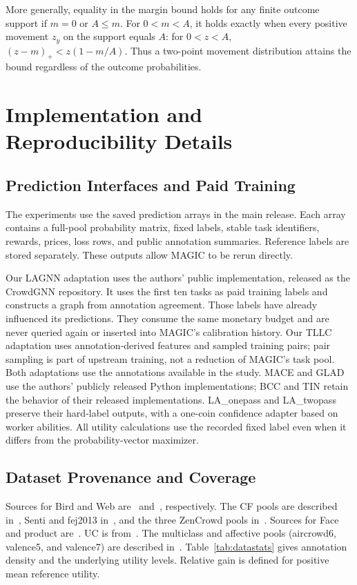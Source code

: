 \documentclass[journal]{IEEEtran}
\begin{document}
More generally, equality in the margin bound holds for any finite outcome support if $m=0$ or $A\le m$. For $0<m<A$, it holds exactly when every positive movement $z_y$ on the support equals $A$: for $0<z<A$, $(z-m)_+< z(1-m/A)$. Thus a two-point movement distribution attains the bound regardless of the outcome probabilities.

\section{Implementation and Reproducibility Details}
\label{app:implementation}
\subsection{Prediction Interfaces and Paid Training}
The experiments use the saved prediction arrays in the main release. Each array contains a full-pool probability matrix, fixed labels, stable task identifiers, rewards, prices, loss rows, and public annotation summaries. Reference labels are stored separately. These outputs allow MAGIC to be rerun directly.

Our LAGNN adaptation uses the authors' public implementation, released as the CrowdGNN repository. It uses the first ten tasks as paid training labels and constructs a graph from annotation agreement. Those labels have already influenced its predictions. They consume the same monetary budget and are never queried again or inserted into MAGIC's calibration history. Our TLLC adaptation uses annotation-derived features and sampled training pairs; pair sampling is part of upstream training, not a reduction of MAGIC's task pool. Both adaptations use the annotations available in the study. MACE and GLAD use the authors' publicly released Python implementations; BCC and TIN retain the behavior of their released implementations. LA\_onepass and LA\_twopass preserve their hard-label outputs, with a one-coin confidence adapter based on worker abilities. All utility calculations use the recorded fixed label even when it differs from the probability-vector maximizer.

\subsection{Dataset Provenance and Coverage}\label{app:data}
Sources for Bird and Web are~\cite{welinder2010multidimensional} and~\cite{zhou2012learning}, respectively. The CF pools are described in~\cite{venanzi2014community,venanzi2015activecrowdtoolkit}, Senti and fej2013 in~\cite{josephy2014workshops}, and the three ZenCrowd pools in~\cite{demartini2012zencrowd}. Sources for Face and product are~\cite{mozafari2014scaling,wang2012crowder,zheng2017truth}. UC is from~\cite{wu2023crowdsourcing}. The multiclass and affective pools (aircrowd6, valence5, and valence7) are described in~\cite{zhang2016multiclass,snow2008cheap}. Table~\ref{tab:datastats} gives annotation density and the underlying utility levels. Relative gain is defined for positive mean reference utility.
\end{document}
